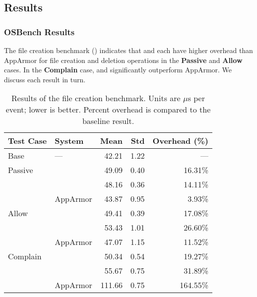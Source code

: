 \subsection{Results}%
\label{ss:eval-results}


\subsubsection{OSBench Results}

The file creation benchmark () indicates that \bpfbox{} and
\bpfcontain{} each have higher overhead than AppArmor for file creation and deletion
operations in the \textbf{Passive} and \textbf{Allow} cases. In the \textbf{Complain}
case, \bpfbox{} and \bpfcontain{} significantly outperform AppArmor. We discuss each
result in turn.

\begingroup\small
\begin{longtable}[c]{llrrr}
  \caption[Results of the file creation benchmark]{
    Results of the file creation benchmark. Units are $\mu$s per event; lower is
    better. Percent overhead is compared to the baseline result.
  }%
  \label{tab:phoronix-files}\\
  \toprule
   Test Case & System         &  Mean  & Std & Overhead (\%)\\
   \midrule
   Base      & ---            &  42.21 & 1.22 &  ---     \\
   \midrule
   Passive   & \bpfbox{}      &  49.09 & 0.40 &  16.31\% \\
             & \bpfcontain{}  &  48.16 & 0.36 &  14.11\% \\
             & AppArmor       &  43.87 & 0.95 &   3.93\% \\
   \midrule
   Allow     & \bpfbox{}      &  49.41 & 0.39 &  17.08\% \\
             & \bpfcontain{}  &  53.43 & 1.01 &  26.60\% \\
             & AppArmor       &  47.07 & 1.15 &  11.52\% \\
   \midrule
   Complain  & \bpfbox{}      &  50.34 & 0.54 &  19.27\% \\
             & \bpfcontain{}  &  55.67 & 0.75 &  31.89\% \\
             & AppArmor       & 111.66 & 0.75 & 164.55\% \\
  \bottomrule
\end{longtable}
\endgroup

